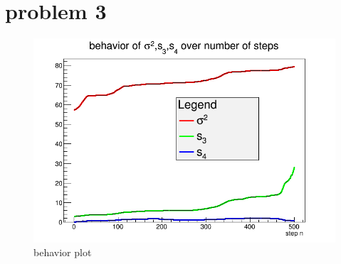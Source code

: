 \documentclass[%
aip,
 jmp,%
 amsmath,amssymb,
preprint,%
]{revtex4-1}
\begin{document}
\section{problem 3}

\begin{figure}
\includegraphics[scale=0.6]{3_3plots} 
\caption{ behavior plot}
\label{sat}
\end{figure}
\end{document}
